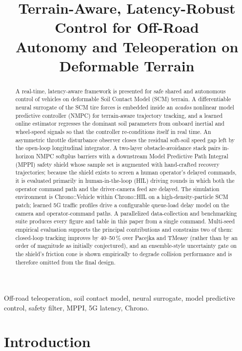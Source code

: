 \documentclass[conference,letterpaper,10pt]{IEEEtran}
\title{Terrain-Aware, Latency-Robust Control for Off-Road\\
       Autonomy and Teleoperation on Deformable Terrain}
\author{%
  \IEEEauthorblockN{Kyle Sha, Zhenhao Zhou, Radu Serban, Dan Negrut}
  \IEEEauthorblockA{Department of Mechanical Engineering,
    University of Wisconsin--Madison\\
    1513 University Ave., Madison, WI 53706, USA\\
    Email: \{kasha2, zzhou292, serban, negrut\}@wisc.edu}}
\begin{document}
\maketitle

\begin{abstract}
A real-time, latency-aware framework is presented for safe shared and
autonomous control of vehicles on deformable Soil Contact Model (SCM)
terrain. A differentiable neural surrogate of the SCM tire forces is
embedded inside an \emph{acados} nonlinear model predictive controller
(NMPC) for terrain-aware trajectory tracking, and a learned online
estimator regresses the dominant soil parameters from onboard inertial
and wheel-speed signals so that the controller re-conditions itself in
real time. An asymmetric throttle disturbance observer closes the
residual soft-soil speed gap left by the open-loop longitudinal
integrator. A two-layer obstacle-avoidance stack pairs in-horizon NMPC
softplus barriers with a downstream Model Predictive Path Integral
(MPPI) safety shield whose sample set is augmented with hand-crafted
recovery trajectories; because the shield exists to screen a human
operator's delayed commands, it is evaluated primarily in
human-in-the-loop (HIL) driving rounds in which both the operator
command path and the driver-camera feed are delayed. The simulation
environment is Chrono::Vehicle within Chrono::HIL on a
high-density-particle SCM patch; learned 5G traffic profiles drive a
configurable queue-load delay model on the camera and
operator-command paths. A parallelized data-collection and
benchmarking suite produces every figure and table in this paper from
a single command. Multi-seed empirical evaluation supports the
principal contributions and constrains two of them: closed-loop
tracking improves by 40--50\,\% over Pacejka and TMeasy (rather than
by an order of magnitude as initially conjectured), and an
ensemble-style uncertainty gate on the shield's friction cone is shown
empirically to degrade collision performance and is therefore omitted
from the final design.
\end{abstract}

\begin{IEEEkeywords}
Off-road teleoperation, soil contact model, neural surrogate, model
predictive control, safety filter, MPPI, 5G latency, Chrono.
\end{IEEEkeywords}

\section{Introduction}
\label{sec:intro}
\end{document}
